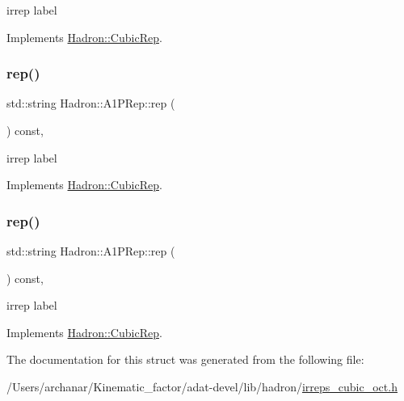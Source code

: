 irrep label 

Implements \mbox{\hyperlink{structHadron_1_1CubicRep_ac3eb63608803d44c68681f158e14eb1b}{Hadron\+::\+Cubic\+Rep}}.

\mbox{\label{structHadron_1_1A1PRep_a8bacecde30050e482f468346bb51da28}} 
\subsubsection{\texorpdfstring{rep()}{rep()}\hspace{0.1cm}{\footnotesize\ttfamily [2/3]}}
{\footnotesize\ttfamily std\+::string Hadron\+::\+A1\+P\+Rep\+::rep (\begin{DoxyParamCaption}{ }\end{DoxyParamCaption}) const\hspace{0.3cm}{\ttfamily [inline]}, {\ttfamily [virtual]}}

irrep label 

Implements \mbox{\hyperlink{structHadron_1_1CubicRep_ac3eb63608803d44c68681f158e14eb1b}{Hadron\+::\+Cubic\+Rep}}.

\mbox{\label{structHadron_1_1A1PRep_a8bacecde30050e482f468346bb51da28}} 
\subsubsection{\texorpdfstring{rep()}{rep()}\hspace{0.1cm}{\footnotesize\ttfamily [3/3]}}
{\footnotesize\ttfamily std\+::string Hadron\+::\+A1\+P\+Rep\+::rep (\begin{DoxyParamCaption}{ }\end{DoxyParamCaption}) const\hspace{0.3cm}{\ttfamily [inline]}, {\ttfamily [virtual]}}

irrep label 

Implements \mbox{\hyperlink{structHadron_1_1CubicRep_ac3eb63608803d44c68681f158e14eb1b}{Hadron\+::\+Cubic\+Rep}}.



The documentation for this struct was generated from the following file\+:\begin{DoxyCompactItemize}
\item 
/\+Users/archanar/\+Kinematic\+\_\+factor/adat-\/devel/lib/hadron/\mbox{\hyperlink{adat-devel_2lib_2hadron_2irreps__cubic__oct_8h}{irreps\+\_\+cubic\+\_\+oct.\+h}}\end{DoxyCompactItemize}
